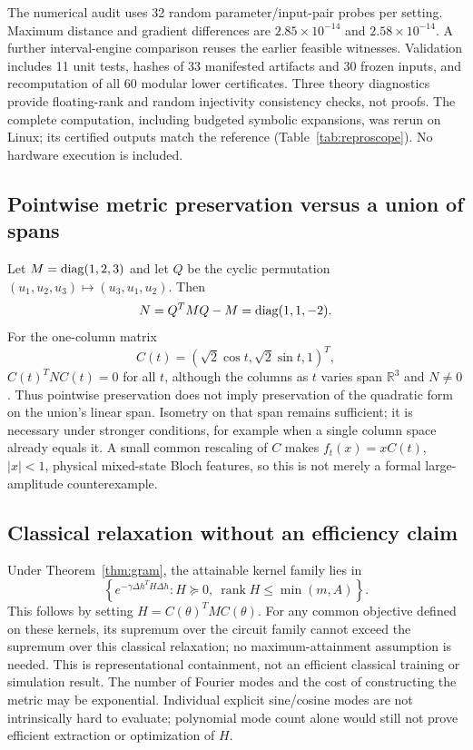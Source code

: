 The numerical audit uses 32 random parameter/input-pair probes
per setting. Maximum distance and gradient differences are
$2.85\times10^{-14}$ and $2.58\times10^{-14}$. A further interval-engine
comparison reuses the earlier feasible witnesses. Validation includes
11 unit tests, hashes of 33 manifested artifacts and 30 frozen inputs,
and recomputation of all 60 modular lower certificates. Three theory
diagnostics provide floating-rank and random injectivity consistency
checks, not proofs. The complete computation, including budgeted
symbolic expansions, was rerun on Linux; its certified outputs match
the reference (Table~\ref{tab:reproscope}). No hardware execution is
included.



\subsection{Pointwise metric preservation versus a union of spans}
Let $M=\operatorname{diag}(1,2,3)$ and let $Q$ be the cyclic permutation
$(u_1,u_2,u_3)\mapsto(u_3,u_1,u_2)$. Then
\begin{equation}
 N=Q^TMQ-M=\operatorname{diag}(1,1,-2).
\end{equation}
For the one-column matrix
\begin{equation}
 C(t)=(\sqrt2\cos t,\sqrt2\sin t,1)^T,
\end{equation}
$C(t)^TNC(t)=0$ for all $t$, although the columns as $t$ varies
span $\mathbb R^3$ and $N\ne0$. Thus pointwise preservation does
not imply preservation of the quadratic form on the union's linear
span. Isometry on that span remains sufficient; it is necessary
under stronger conditions, for example when a single column space
already equals it. A small common rescaling of $C$ makes $f_t(x)=xC(t)$,
$|x|<1$, physical mixed-state Bloch features, so this is not merely
a formal large-amplitude counterexample.

\subsection{Classical relaxation without an efficiency claim}
Under Theorem~\ref{thm:gram}, the attainable kernel family lies in
\begin{equation}
 \left\{e^{-\gamma\Delta h^T H\Delta h}:
 H\succeq0,\ \operatorname{rank}H\le\min(m,A)\right\}.
\end{equation}
This follows by setting $H=C(\theta)^TMC(\theta)$. For any common
objective defined on these kernels, its supremum over the circuit
family cannot exceed the supremum over this classical relaxation;
no maximum-attainment assumption is needed. This is representational
containment, not an efficient classical training or simulation result.
The number of Fourier modes and the cost of constructing the metric
may be exponential. Individual explicit sine/cosine modes are not
intrinsically hard to evaluate; polynomial mode count alone would
still not prove efficient extraction or optimization of $H$.

